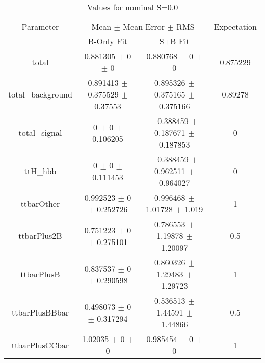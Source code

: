 \begin{table}
\centering
\caption{Values for nominal S=0.0}
\begin{tabular}{cccc}
\toprule
Parameter & \multicolumn{2}{c}{Mean $\pm$ Mean Error $\pm$ RMS} & Expectation\\
 & B-Only Fit & S+B Fit & \\
\midrule
total & \num{0.881305} $\pm$ \num{0} $\pm$ \num{0} & \num{0.880768} $\pm$ \num{0} $\pm$ \num{0} & \num{0.875229}\\
total\_background & \num{0.891413} $\pm$ \num{0.375529} $\pm$ \num{0.37553} & \num{0.895326} $\pm$ \num{0.375165} $\pm$ \num{0.375166} & \num{0.89278}\\
total\_signal & \num{0} $\pm$ \num{0} $\pm$ \num{0.106205} & \num{-0.388459} $\pm$ \num{0.187671} $\pm$ \num{0.187853} & \num{0}\\
ttH\_hbb & \num{0} $\pm$ \num{0} $\pm$ \num{0.111453} & \num{-0.388459} $\pm$ \num{0.962511} $\pm$ \num{0.964027} & \num{0}\\
ttbarOther & \num{0.992523} $\pm$ \num{0} $\pm$ \num{0.252726} & \num{0.996468} $\pm$ \num{1.01728} $\pm$ \num{1.019} & \num{1}\\
ttbarPlus2B & \num{0.751223} $\pm$ \num{0} $\pm$ \num{0.275101} & \num{0.786553} $\pm$ \num{1.19878} $\pm$ \num{1.20097} & \num{0.5}\\
ttbarPlusB & \num{0.837537} $\pm$ \num{0} $\pm$ \num{0.290598} & \num{0.860326} $\pm$ \num{1.29483} $\pm$ \num{1.29723} & \num{1}\\
ttbarPlusBBbar & \num{0.498073} $\pm$ \num{0} $\pm$ \num{0.317294} & \num{0.536513} $\pm$ \num{1.44591} $\pm$ \num{1.44866} & \num{0.5}\\
ttbarPlusCCbar & \num{1.02035} $\pm$ \num{0} $\pm$ \num{0} & \num{0.985454} $\pm$ \num{0} $\pm$ \num{0} & \num{1}\\
\bottomrule
\end{tabular}
\end{table}